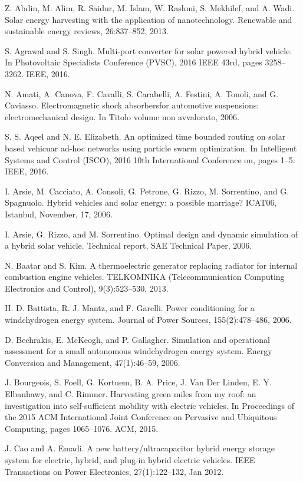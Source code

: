 
Z. Abdin, M. Alim, R. Saidur, M. Islam, W. Rashmi, S. Mekhilef, and A. Wadi. Solar energy harvesting with the application of nanotechnology.  Renewable and sustainable energy reviews, 26:837--852, 2013.

 S. Agrawal and S. Singh. Multi-port converter for solar powered hybrid vehicle. In Photovoltaic Specialists Conference (PVSC), 2016 IEEE 43rd, pages 3258--3262. IEEE, 2016.

 N. Amati, A. Canova, F. Cavalli, S. Carabelli, A. Festini, A. Tonoli, and G. Caviasso. Electromagnetic shock absorbersfor automotive suspensions: electromechanical design. In Titolo volume non avvalorato, 2006.

 S. S. Aqeel and N. E. Elizabeth. An optimized time bounded routing on solar based vehicuar ad-hoc networks using particle swarm optimization. In Intelligent Systems and Control (ISCO), 2016 10th International Conference on, pages 1--5. IEEE, 2016.

 I. Arsie, M. Cacciato, A. Consoli, G. Petrone, G. Rizzo, M. Sorrentino, and G. Spagnuolo. Hybrid vehicles and solar energy: a possible marriage? ICAT06, Istanbul,
November, 17, 2006.

 I. Arsie, G. Rizzo, and M. Sorrentino. Optimal design
and dynamic simulation of a hybrid solar vehicle.
Technical report, SAE Technical Paper, 2006.

 N. Baatar and S. Kim. A thermoelectric generator replacing radiator for internal combustion engine vehicles. TELKOMNIKA (Telecommunication Computing
Electronics and Control), 9(3):523--530, 2013.

 H. D. Battista, R. J. Mantz, and F. Garelli. Power conditioning for a windchydrogen energy system. Journal
of Power Sources, 155(2):478--486, 2006.

 D. Bechrakis, E. McKeogh, and P. Gallagher. Simulation and operational assessment for a small autonomous windchydrogen energy system. Energy Conversion and Management, 47(1):46--59, 2006.

 J. Bourgeois, S. Foell, G. Kortuem, B. A. Price, J. Van Der Linden, E. Y. Elbanhawy, and C. Rimmer. Harvesting green miles from my roof: an investigation into self-sufficient mobility with electric vehicles. In Proceedings of the 2015 ACM International Joint Conference on Pervasive and Ubiquitous Computing, pages
1065--1076. ACM, 2015.

 J. Cao and A. Emadi. A new battery/ultracapacitor
hybrid energy storage system for electric, hybrid, and plug-in hybrid electric vehicles. IEEE Transactions on Power Electronics, 27(1):122--132, Jan 2012.


